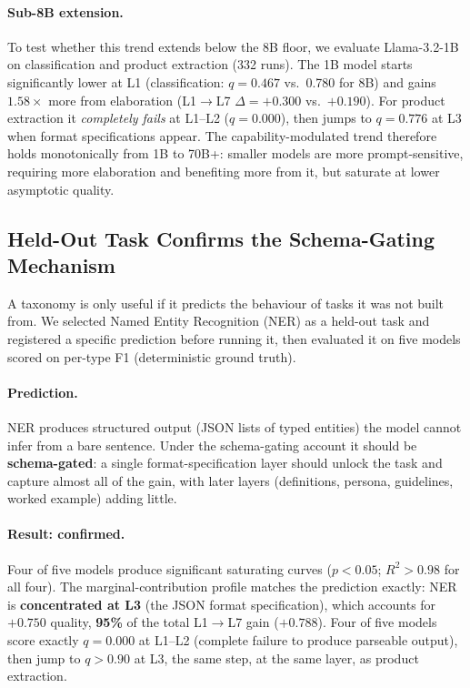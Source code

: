 \paragraph{Sub-8B extension.}
To test whether this trend extends below the 8B floor, we evaluate Llama-3.2-1B
on classification and product extraction (332 runs). The 1B model starts
significantly lower at L1 (classification: $q=0.467$ vs.\ 0.780 for 8B) and
gains $1.58\times$ more from elaboration (L1$\to$L7 $\Delta = +0.300$ vs.\
$+0.190$). For product extraction it \emph{completely fails} at L1--L2
($q=0.000$), then jumps to $q=0.776$ at L3 when format specifications appear.
The capability-modulated trend therefore holds monotonically from 1B to 70B+:
smaller models are more prompt-sensitive, requiring more elaboration and
benefiting more from it, but saturate at lower asymptotic quality.

\subsection{Held-Out Task Confirms the Schema-Gating Mechanism}
\label{sec:result-holdout}

A taxonomy is only useful if it predicts the behaviour of tasks it was not built
from. We selected Named Entity Recognition (NER) as a held-out task and
registered a specific prediction before running it, then evaluated it on five
models scored on per-type F1 (deterministic ground truth).

\paragraph{Prediction.}
NER produces structured output (JSON lists of typed entities) the model cannot
infer from a bare sentence. Under the schema-gating account it should be
\textbf{schema-gated}: a single format-specification layer should unlock the
task and capture almost all of the gain, with later layers (definitions,
persona, guidelines, worked example) adding little.

\paragraph{Result: confirmed.}
Four of five models produce significant saturating curves ($p < 0.05$; $R^2 >
0.98$ for all four). The marginal-contribution profile matches the prediction
exactly: NER is \textbf{concentrated at L3} (the JSON format specification),
which accounts for $+0.750$ quality, \textbf{95\%} of the total L1$\to$L7 gain
($+0.788$). Four of five models score exactly $q = 0.000$ at L1--L2 (complete
failure to produce parseable output), then jump to $q > 0.90$ at L3, the same
step, at the same layer, as product extraction.

